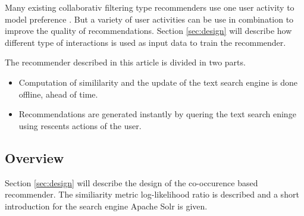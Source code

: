 Many existing collaborativ filtering type recommenders use one user activity to model preference \cite{ferrel}. But a variety of user activities can be use in combination to improve the quality of recommendations. Section \ref{sec:design} will describe how different type of interactions is used as input data to train the recommender.

The recommender described in this article is divided in two parts.
\begin{itemize}
\item Computation of simililarity and the update of the text search engine is done offline, ahead of time.
\item Recommendations are generated instantly by quering the text search eninge using rescents actions of the user.


\end{itemize}

\subsection{Overview}

Section \ref{sec:design} will describe the design of the co-occurence based recommender. The similiarity metric log-likelihood ratio is described and a short introduction for the search engine Apache Solr is given.
